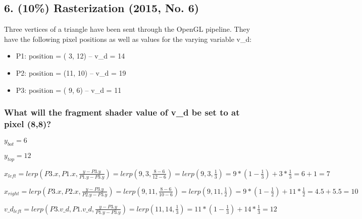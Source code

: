 \subsection{6. (10\%) Rasterization (2015, No. 6)}
Three vertices of a triangle have been sent through the OpenGL pipeline. They have the following pixel positions as well as values for the varying variable v\_d:

\begin{itemize}
    \item P1: position = ( 3, 12) – v\_d = 14  
    \item P2: position = (11, 10) – v\_d = 19 
    \item P3: position = ( 9,  6) – v\_d = 11 
\end{itemize}

\subsubsection{What will the fragment shader value of v\_d be set to at pixel (8,8)?}


$y_{bot} = 6$

$y_{top} = 12$

$
    x_{left}
=
    lerp\left(P3.x, P1.x, \frac{y - P3.y}{P1.y - P3.y}\right)
=
    lerp\left(9, 3, \frac{8 - 6}{12 - 6}\right)
=
    lerp\left(9, 3, \frac{1}{3}\right)
=
    9 * \left(1 - \frac{1}{3}\right) + 3 * \frac{1}{3} 
=
    6 + 1
=
    7
$

$
    x_{right}
=
    lerp\left(P3.x, P2.x, \frac{y - P3.y}{P2.y - P3.y}\right)
=
    lerp\left(9, 11, \frac{8 - 6}{10 - 6}\right)
=
    lerp\left(9, 11, \frac{1}{2}\right)
=
    9 * \left(1 - \frac{1}{2}\right) + 11 * \frac{1}{2} 
=
    4.5 + 5.5
=
    10
$

$
    v\_d_{left}
=
    lerp\left(P3.v\_d, P1.v\_d, \frac{y - P3.y}{P1.y - P3.y}\right)
=
    lerp(11, 14, \frac{1}{3})
=
    11 * \left(1 - \frac{1}{3}\right) + 14 * \frac{1}{3}
=
    12
$

